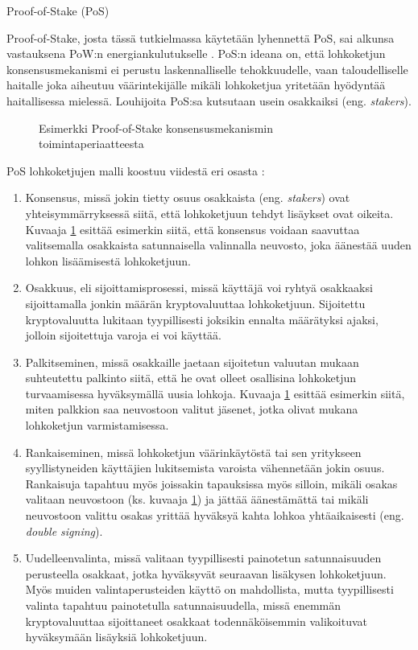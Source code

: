 \newpage
\begin{section}{Proof-of-Stake (PoS)\label{pos}}

Proof-of-Stake, josta tässä tutkielmassa käytetään lyhennettä PoS, sai alkunsa vastauksena PoW:n energiankulutukselle \cite{pos2}. PoS:n ideana on, että lohkoketjun konsensusmekanismi ei perustu laskennalliselle tehokkuudelle, vaan taloudelliselle haitalle joka aiheutuu väärintekijälle mikäli lohkoketjua yritetään hyödyntää haitallisessa mielessä. Louhijoita PoS:sa kutsutaan usein osakkaiksi (eng. \textit{stakers}).

\vspace{1mm}

\begin{figure}[!htbp]
\centering
{}
\caption{Esimerkki Proof-of-Stake konsensusmekanismin toimintaperiaatteesta}
\label{fig_pos}
\end{figure}

\vspace{1mm}

PoS lohkoketjujen malli koostuu viidestä eri osasta \cite{pos1, pos2}:

\begin{enumerate}
\item Konsensus, missä jokin tietty osuus osakkaista (eng. \textit{stakers}) ovat yhteisymmärryksessä siitä, että lohkoketjuun tehdyt lisäykset ovat oikeita. Kuvaaja \ref{fig_pos} esittää esimerkin siitä, että konsensus voidaan saavuttaa valitsemalla osakkaista satunnaisella valinnalla neuvosto, joka äänestää uuden lohkon lisäämisestä lohkoketjuun.
\item Osakkuus, eli sijoittamisprosessi, missä käyttäjä voi ryhtyä osakkaaksi sijoittamalla jonkin määrän kryptovaluuttaa lohkoketjuun. Sijoitettu kryptovaluutta lukitaan tyypillisesti joksikin ennalta määrätyksi ajaksi, jolloin sijoitettuja varoja ei voi käyttää.
\item Palkitseminen, missä osakkaille jaetaan sijoitetun valuutan mukaan suhteutettu palkinto siitä, että he ovat olleet osallisina lohkoketjun turvaamisessa hyväksymällä uusia lohkoja. Kuvaaja \ref{fig_pos} esittää esimerkin siitä, miten palkkion saa neuvostoon valitut jäsenet, jotka olivat mukana lohkoketjun varmistamisessa.
\item Rankaiseminen, missä lohkoketjun väärinkäytöstä tai sen yritykseen syyllistyneiden käyttäjien lukitsemista varoista vähennetään jokin osuus. Rankaisuja tapahtuu myös joissakin tapauksissa myös silloin, mikäli osakas valitaan neuvostoon (ks. kuvaaja \ref{fig_pos}) ja jättää äänestämättä tai mikäli neuvostoon valittu osakas yrittää hyväksyä kahta lohkoa yhtäaikaisesti (eng. \textit{double signing}).
\item Uudelleenvalinta, missä valitaan tyypillisesti painotetun satunnaisuuden perusteella osakkaat, jotka hyväksyvät seuraavan lisäkysen lohkoketjuun. Myös muiden valintaperusteiden käyttö on mahdollista, mutta tyypillisesti valinta tapahtuu painotetulla satunnaisuudella, missä enemmän kryptovaluuttaa sijoittaneet osakkaat todennäköisemmin valikoituvat hyväksymään lisäyksiä lohkoketjuun.
\end{enumerate}


\end{section}

